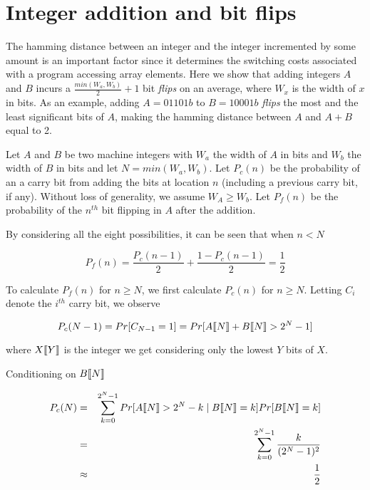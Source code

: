 \chapter{Integer addition and bit flips}

\label{AppendixC}


The hamming distance between an integer and the integer incremented by
some amount is an important factor since it determines the switching
costs associated with a program accessing array elements.  Here we
show that adding integers $A$ and $B$ incurs a $\frac{min(W_a,
  W_b)}{2} + 1$ bit \textit{flips} on an average, where $W_x$ is the
width of $x$ in bits.  As an example, adding $A = 01101b$ to $B =
10001b$ \textit{flips} the most and the least significant bits of $A$,
making the hamming distance between $A$ and $A + B$ equal to 2.

Let $A$ and $B$ be two machine integers with $W_a$ the width of $A$ in
bits and $W_b$ the width of $B$ in bits and let $N = min(W_a, W_b)$.
Let $P_c(n)$ be the probability of an a carry bit from adding the bits
at location $n$ (including a previous carry bit, if any).  Without
loss of generality, we assume $W_A \geq W_b$.  Let $P_f(n)$ be the
probability of the $n^{th}$ bit flipping in $A$ after the addition.

By considering all the eight possibilities, it can be seen that when
$n < N$

\begin{equation}
    P_f(n) = \frac{P_c(n - 1)}{2} + \frac{1 - P_c(n - 1)}{2} =
    \frac{1}{2}
\end{equation}

To calculate $P_f(n)$ for $n \geq N$, we first calculate $P_c(n)$ for
$n \geq N$.  Letting $C_i$ denote the $i^{th}$ carry bit, we observe

\begin{equation}
  P_c(N - 1) = Pr[C_{N - 1} = 1] = Pr[A\llbracket N \rrbracket  + B\llbracket N \rrbracket  >
    2^N - 1]
\end{equation}

where $X\llbracket Y \rrbracket $ is the integer we get considering only the
lowest $Y$ bits of $X$.

Conditioning on $B\llbracket N \rrbracket $

\begin{eqnarray*}
  P_c(N) & = & \displaystyle\sum\limits_{k=0}^{2^{N} - 1}
  Pr[A\llbracket N \rrbracket  > 2^N - k \mid B\llbracket N \rrbracket  = k] Pr[B\llbracket N \rrbracket  = k] \\
  & = & \displaystyle\sum\limits_{k=0}^{2^{N} - 1} \frac{k}{(2^N - 1)^2} \\
  & \approx & \frac{1}{2}
\end{eqnarray*}

